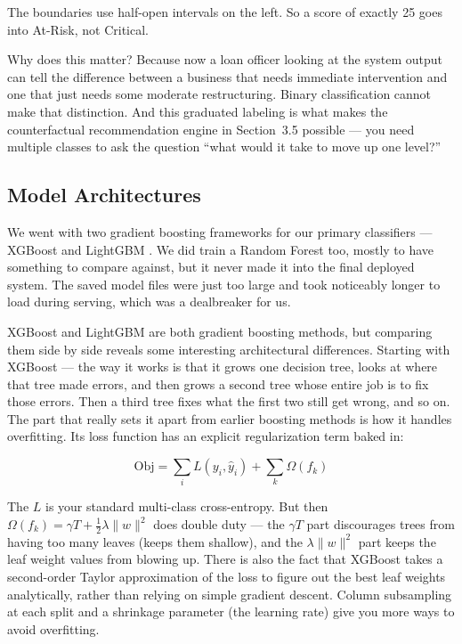 The boundaries use half-open intervals on the left. So a score of exactly 25 goes into At-Risk, not Critical.

Why does this matter? Because now a loan officer looking at the system output can tell the difference between a business that needs immediate intervention and one that just needs some moderate restructuring. Binary classification cannot make that distinction. And this graduated labeling is what makes the counterfactual recommendation engine in Section~3.5 possible --- you need multiple classes to ask the question ``what would it take to move up one level?''

\subsection{Model Architectures}

We went with two gradient boosting frameworks for our primary classifiers --- XGBoost \cite{10} and LightGBM \cite{11}. We did train a Random Forest \cite{9} too, mostly to have something to compare against, but it never made it into the final deployed system. The saved model files were just too large and took noticeably longer to load during serving, which was a dealbreaker for us.

XGBoost and LightGBM are both gradient boosting methods, but comparing them side by side reveals some interesting architectural differences. Starting with XGBoost --- the way it works is that it grows one decision tree, looks at where that tree made errors, and then grows a second tree whose entire job is to fix those errors. Then a third tree fixes what the first two still get wrong, and so on. The part that really sets it apart from earlier boosting methods is how it handles overfitting. Its loss function has an explicit regularization term baked in:

\begin{equation}
\text{Obj} = \sum_{i} L(y_i, \hat{y}_i) + \sum_{k} \Omega(f_k)
\end{equation}

The $L$ is your standard multi-class cross-entropy. But then $\Omega(f_k) = \gamma T + \tfrac{1}{2}\lambda \|w\|^2$ does double duty --- the $\gamma T$ part discourages trees from having too many leaves (keeps them shallow), and the $\lambda \|w\|^2$ part keeps the leaf weight values from blowing up. There is also the fact that XGBoost takes a second-order Taylor approximation of the loss to figure out the best leaf weights analytically, rather than relying on simple gradient descent. Column subsampling at each split and a shrinkage parameter (the learning rate) give you more ways to avoid overfitting.

